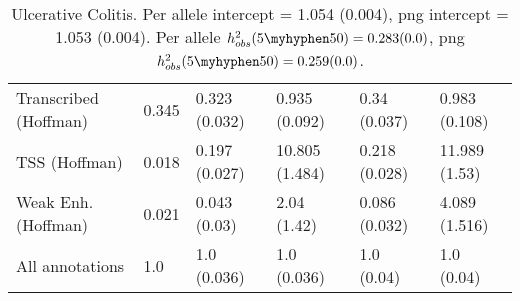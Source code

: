 \documentclass[11pt]{article}
\begin{document}
\begin{table}[H]
\begin{center}
\begin{tabular}{l|lllll}
Transcribed (Hoffman)  &  0.345 & 0.323 (0.032) & 0.935 (0.092) &
0.34 (0.037) & 0.983 (0.108) \\
TSS (Hoffman)  &  0.018 & 0.197 (0.027) & 10.805 (1.484) &
0.218 (0.028) & 11.989 (1.53) \\
Weak Enh. (Hoffman)  &  0.021 & 0.043 (0.03) & 2.04 (1.42) &
0.086 (0.032) & 4.089 (1.516) \\
All annotations  &  1.0 & 1.0 (0.036) & 1.0 (0.036) &
1.0 (0.04) & 1.0 (0.04) \\
\end{tabular}
\caption{Ulcerative Colitis.
Per allele intercept = 1.054 (0.004),
png intercept = 1.053 (0.004).
Per allele $h^2_{obs}(5\myhyphen50) = 0.283 (0.0)$,
png $h^2_{obs}(5\myhyphen50) = 0.259 (0.0)$.}
\end{center}
\end{table}
\end{document}
